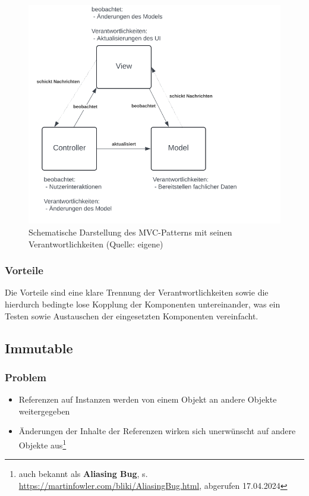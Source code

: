 \begin{figure}
    \centering
    \includegraphics[scale=0.4]{part two/Objektorientierter Entwurf/img/mvc}
    \caption{Schematische Darstellung des MVC-Patterns mit seinen Verantwortlichkeiten (Quelle: eigene)}
    \label{fig:mvc}
\end{figure}

\subsubsection*{Vorteile}
Die Vorteile sind eine klare Trennung der Verantwortlichkeiten sowie die hierdurch bedingte lose Kopplung der Komponenten untereinander, was ein Testen sowie Austauschen der eingesetzten Komponenten vereinfacht.

\subsection{Immutable}\label{subsec:immutable}

\subsubsection*{Problem}
\begin{itemize}
    \item Referenzen auf Instanzen werden von einem Objekt an andere Objekte weitergegeben
    \item Änderungen der Inhalte der Referenzen wirken sich unerwünscht auf andere Objekte aus\footnote{
    auch bekannt als \textbf{Aliasing Bug}, s. \url{https://martinfowler.com/bliki/AliasingBug.html}, abgerufen 17.04.2024
    }
\end{itemize}

